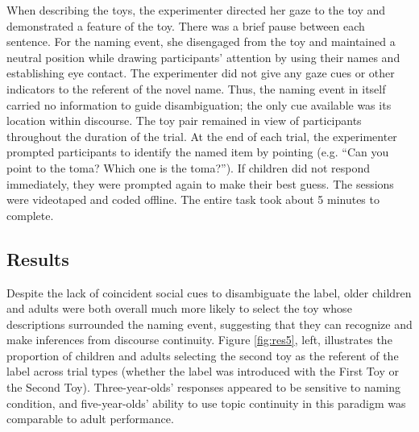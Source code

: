 \documentclass[man]{apa2}
\begin{document}
When describing the toys, the experimenter directed her gaze to the toy and demonstrated a feature of the toy.  There was a brief pause between each sentence.  For the naming event, she disengaged from the toy and maintained a neutral position while drawing participants' attention by using their names and establishing eye contact.  The experimenter did not give any gaze cues or other indicators to the referent of the novel name.  Thus, the naming event in itself carried no information to guide disambiguation; the only cue available was its location within discourse.  The toy pair remained in view of participants throughout the duration of the trial.  At the end of each trial, the experimenter prompted participants to identify the named item by pointing (e.g. ``Can you point to the toma? Which one is the toma?'').  If children did not respond immediately, they were prompted again to make their best guess. The sessions were videotaped and coded offline. The entire task took about 5 minutes to complete. 
 

\subsection{Results}

Despite the lack of coincident social cues to disambiguate the label, older children and adults were both overall much more likely to select the toy whose descriptions surrounded the naming event, suggesting that they can recognize and make inferences from discourse continuity.  Figure \ref{fig:res5}, left, illustrates the proportion of children and adults selecting the second toy as the referent of the label across trial types (whether the label was introduced with the First Toy or the Second Toy). Three-year-olds' responses appeared to be sensitive to naming condition, and five-year-olds' ability to use topic continuity in this paradigm was comparable to adult performance.
\end{document}

